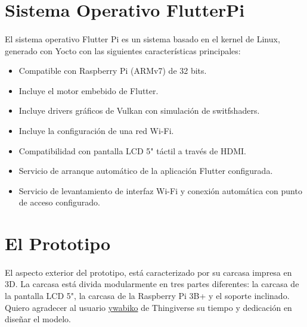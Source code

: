 \section{Sistema Operativo FlutterPi}\label{sec:flutterpi}

\paragraph{}El sistema operativo Flutter Pi es un sistema basado en el kernel de Linux,
generado con Yocto con las siguientes características principales:

\begin{itemize}
    \item Compatible con Raspberry Pi (ARMv7) de 32 bits.
    \item Incluye el motor embebido de Flutter.
    \item Incluye drivers gráficos de Vulkan con simulación de switfshaders.
    \item Incluye la configuración de una red Wi-Fi.
    \item Compatibilidad con pantalla LCD 5" táctil a través de HDMI.
    \item Servicio de arranque automático de la aplicación Flutter configurada.
    \item Servicio de levantamiento de interfaz Wi-Fi y conexión automática con
    punto de acceso configurado.
\end{itemize}

\section{El Prototipo}\label{sec:prototipo}

\paragraph{}El aspecto exterior del prototipo, está caracterizado por su carcasa impresa
en 3D. La carcasa está divida modularmente en tres partes diferentes: la carcasa de la
pantalla LCD 5", la carcasa de la Raspberry Pi 3B+ y el soporte inclinado. Quiero
agradecer al usuario \href{https://www.thingiverse.com/thing:3444545}{ywabiko} de
Thingiverse su tiempo y dedicación en diseñar el modelo.

